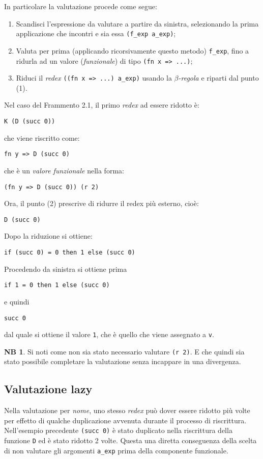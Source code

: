 \documentclass[12pt, a4paper]{report}
\theoremstyle{definition}
\newtheorem*{note}{NB}
\newcommand{\code}[1]{\texttt{#1}}
\begin{document}
In particolare la valutazione procede come segue:
\begin{enumerate}
    \item Scandisci l'espressione da valutare a partire da sinistra, selezionando
    la prima applicazione che incontri e sia essa \code{(f\_exp a\_exp)};
    \item Valuta per prima (applicando ricorsivamente questo metodo) \code{f\_exp},
    fino a ridurla ad un valore (\emph{funzionale}) di tipo \code{(fn x => ...)};
    \item Riduci il \emph{redex} \code{((fn x => ...) a\_exp)} usando la
    $\beta$\emph{-regola} e riparti dal punto (1).
\end{enumerate}
Nel caso del Frammento 2.1, il primo \emph{redex} ad essere ridotto è:
\begin{lstlisting}
K (D (succ 0))
\end{lstlisting}
che viene riscritto come:
\begin{lstlisting}
fn y => D (succ 0)
\end{lstlisting}
che è un \emph{valore funzionale} nella forma:
\begin{lstlisting}
(fn y => D (succ 0)) (r 2)
\end{lstlisting}
Ora, il punto (2) prescrive di ridurre il redex più esterno, cioè:
\begin{lstlisting}
D (succ 0)
\end{lstlisting}
Dopo la riduzione si ottiene:
\begin{lstlisting}
if (succ 0) = 0 then 1 else (succ 0)
\end{lstlisting}
Procedendo da sinistra si ottiene prima
\begin{lstlisting}
if 1 = 0 then 1 else (succ 0)
\end{lstlisting}
e quindi
\begin{lstlisting}
succ 0    
\end{lstlisting}
dal quale si ottiene il valore \code{1}, che è quello che viene assegnato a \code{v}.

\begin{note}
    Si noti come non sia stato necessario valutare \code{(r 2)}. E che quindi
    sia stato possibile completare la valutazione senza incappare in una divergenza.
\end{note}

\subsection{Valutazione lazy}
Nella valutazione per \emph{nome}, uno stesso \emph{redex} può dover essere
ridotto più volte per effetto di qualche duplicazione avvenuta durante il
processo di riscrittura. Nell'esempio precedente \code{(succ 0)} è stato
duplicato nella riscrittura della funzione \code{D} ed è stato ridotto 2 volte.
Questa una diretta conseguenza della scelta di non valutare gli argomenti
\code{a\_exp} prima della componente funzionale.
\end{document}
